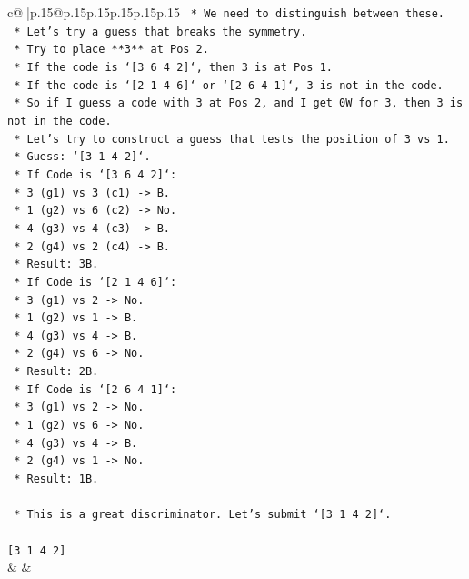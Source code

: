 \documentclass{article}
\begin{document}
{\begin{supertabular}{c@{$\;$}|p{.15\linewidth}@{}p{.15\linewidth}p{.15\linewidth}p{.15\linewidth}p{.15\linewidth}p{.15\linewidth}}
{{{\texttt{    *   We need to distinguish between these.} \\
\texttt{    *   Let's try a guess that breaks the symmetry.} \\
\texttt{    *   Try to place **3** at Pos 2.} \\
\texttt{        *   If the code is `{[}3 6 4 2{]}`, then 3 is at Pos 1.} \\
\texttt{        *   If the code is `{[}2 1 4 6{]}` or `{[}2 6 4 1{]}`, 3 is not in the code.} \\
\texttt{        *   So if I guess a code with 3 at Pos 2, and I get 0W for 3, then 3 is not in the code.} \\
\texttt{        *   Let's try to construct a guess that tests the position of 3 vs 1.} \\
\texttt{        *   Guess: `{[}3 1 4 2{]}`.} \\
\texttt{            *   If Code is `{[}3 6 4 2{]}`:} \\
\texttt{                *   3 (g1) vs 3 (c1) {-}> B.} \\
\texttt{                *   1 (g2) vs 6 (c2) {-}> No.} \\
\texttt{                *   4 (g3) vs 4 (c3) {-}> B.} \\
\texttt{                *   2 (g4) vs 2 (c4) {-}> B.} \\
\texttt{                *   Result: 3B.} \\
\texttt{            *   If Code is `{[}2 1 4 6{]}`:} \\
\texttt{                *   3 (g1) vs 2 {-}> No.} \\
\texttt{                *   1 (g2) vs 1 {-}> B.} \\
\texttt{                *   4 (g3) vs 4 {-}> B.} \\
\texttt{                *   2 (g4) vs 6 {-}> No.} \\
\texttt{                *   Result: 2B.} \\
\texttt{            *   If Code is `{[}2 6 4 1{]}`:} \\
\texttt{                *   3 (g1) vs 2 {-}> No.} \\
\texttt{                *   1 (g2) vs 6 {-}> No.} \\
\texttt{                *   4 (g3) vs 4 {-}> B.} \\
\texttt{                *   2 (g4) vs 1 {-}> No.} \\
\texttt{                *   Result: 1B.} \\
\\ 
\texttt{    *   This is a great discriminator. Let's submit `{[}3 1 4 2{]}`.} \\
\\ 
\texttt{{[}3 1 4 2{]}} \\
            }
        }
    }
    & & \\ \\


\end{supertabular}}
\end{document}
